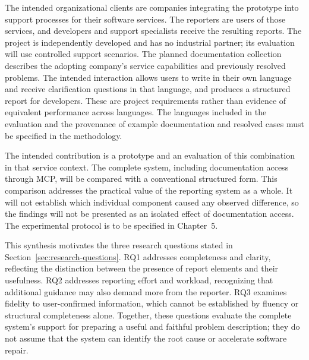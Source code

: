 The intended organizational clients are companies integrating the prototype into support processes for their software services. The reporters are users of those services, and developers and support specialists receive the resulting reports. The project is independently developed and has no industrial partner; its evaluation will use controlled support scenarios. The planned documentation collection describes the adopting company's service capabilities and previously resolved problems. The intended interaction allows users to write in their own language and receive clarification questions in that language, and produces a structured report for developers. These are project requirements rather than evidence of equivalent performance across languages. The languages included in the evaluation and the provenance of example documentation and resolved cases must be specified in the methodology.

The intended contribution is a prototype and an evaluation of this combination in that service context. The complete system, including documentation access through MCP, will be compared with a conventional structured form. This comparison addresses the practical value of the reporting system as a whole. It will not establish which individual component caused any observed difference, so the findings will not be presented as an isolated effect of documentation access. The experimental protocol is to be specified in Chapter~5.

This synthesis motivates the three research questions stated in Section~\ref{sec:research-questions}. RQ1 addresses completeness and clarity, reflecting the distinction between the presence of report elements and their usefulness. RQ2 addresses reporting effort and workload, recognizing that additional guidance may also demand more from the reporter. RQ3 examines fidelity to user-confirmed information, which cannot be established by fluency or structural completeness alone. Together, these questions evaluate the complete system's support for preparing a useful and faithful problem description; they do not assume that the system can identify the root cause or accelerate software repair.
